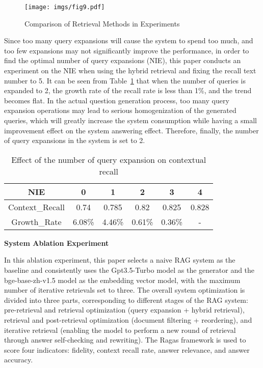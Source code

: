 \begin{figure} [h] 
    \centering
    \texttt{[image: imgs/fig9.pdf]}
    \caption{Comparison of Retrieval Methods in Experiments}
    \label{fig:fig9}
\end{figure}


Since too many query expansions will cause the system to spend too much, and too few expansions may not significantly improve the performance, in order to find the optimal number of query expansions (NIE), this paper conducts an experiment on the NIE when using the hybrid retrieval and fixing the recall text number to 5. It can be seen from Table~\ref{tab:tab5} that when the number of queries is expanded to 2, the growth rate of the recall rate is less than 1\%, and the trend becomes flat. In the actual question generation process, too many query expansion operations may lead to serious homogenization of the generated queries, which will greatly increase the system consumption while having a small improvement effect on the system answering effect. Therefore, finally, the number of query expansions in the system is set to 2.

\begin{table}[htbp]
\centering
\caption{Effect of the number of query expansion on contextual recall}
\begin{tabular}{cccccc}
\toprule
NIE & 0 & 1 & 2 & 3 & 4 \\
\midrule
Context\_Recall & 0.74 & 0.785 & 0.82 & 0.825 & 0.828 \\
Growth\_Rate & 6.08\% & 4.46\% & 0.61\% & 0.36\% & - \\
\bottomrule
\end{tabular}
\label{tab:tab5}
\end{table}

\textbf{System Ablation Experiment}

In this ablation experiment, this paper selects a naive RAG system as the baseline and consistently uses the Gpt3.5-Turbo model as the generator and the bge-base-zh-v1.5 model as the embedding vector model, with the maximum number of iterative retrievals set to three. The overall system optimization is divided into three parts, corresponding to different stages of the RAG system: pre-retrieval and retrieval optimization (query expansion + hybrid retrieval), retrieval and post-retrieval optimization (document filtering + reordering), and iterative retrieval (enabling the model to perform a new round of retrieval through answer self-checking and rewriting). The Ragas framework is used to score four indicators: fidelity, context recall rate, answer relevance, and answer accuracy.




